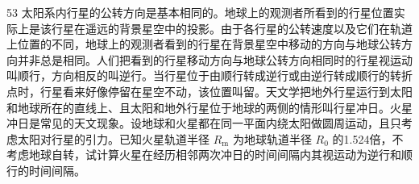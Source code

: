 \begin{problem}[第32届全国中学生物理竞赛决赛]{53}
太阳系内行星的公转方向是基本相同的。地球上的观测者所看到的行星位置实际上是该行星在遥远的背景星空中的投影。由于各行星的公转速度以及它们在轨道上位置的不同，地球上的观测者看到的行星在背景星空中移动的方向与地球公转方向并非总是相同。人们把看到的行星移动方向与地球公转方向相同时的行星视运动叫顺行，方向相反的叫逆行。当行星位于由顺行转成逆行或由逆行转成顺行的转折点时，行星看来好像停留在星空不动，该位置叫留。天文学把地外行星运行到太阳和地球所在的直线上、且太阳和地外行星位于地球的两侧的情形叫行星冲日。火星冲日是常见的天文现象。设地球和火星都在同一平面内绕太阳做圆周运动，且只考虑太阳对行星的引力。已知火星轨道半径 $R_{\mathrm{m}}$ 为地球轨道半径 $R_{0}$ 的1.524倍，不考虑地球自转，试计算火星在经历相邻两次冲日的时间间隔内其视运动为逆行和顺行的时间间隔。
\end{problem}
